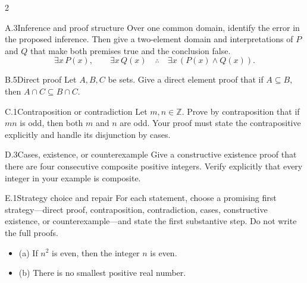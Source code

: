 \documentclass[9pt]{extarticle}
\begin{document}
\begin{multicols}{2}
\begin{CoreProblem}{A.3}{Inference and proof structure}
Over one common domain, identify the error in the proposed inference. Then give
a two-element domain and interpretations of $P$ and $Q$ that make both premises
true and the conclusion false.
\[
\exists x\,P(x),\qquad \exists x\,Q(x)
\quad\therefore\quad
\exists x\,(P(x)\land Q(x)).
\]
\end{CoreProblem}
\begin{CoreProblem}{B.5}{Direct proof}
Let $A,B,C$ be sets. Give a direct element proof that if $A\subseteq B$, then
$A\cap C\subseteq B\cap C$.
\end{CoreProblem}
\begin{CoreProblem}{C.1}{Contraposition or contradiction}
Let $m,n\in\mathbb Z$. Prove by contraposition that if $mn$ is odd, then both
$m$ and $n$ are odd. Your proof must state the contrapositive explicitly and
handle its disjunction by cases.
\end{CoreProblem}
\columnbreak
\begin{CoreProblem}{D.3}{Cases, existence, or counterexample}
Give a constructive existence proof that there are four consecutive composite
positive integers. Verify explicitly that every integer in your example is
composite.
\end{CoreProblem}
\begin{CoreProblem}{E.1}{Strategy choice and repair}
For each statement, choose a promising first strategy---direct proof,
contraposition, contradiction, cases, constructive existence, or
counterexample---and state the first substantive step. Do not write the full
proofs.
\begin{itemize}
  \item (a) If $n^2$ is even, then the integer $n$ is even.
  \item (b) There is no smallest positive real number.
\end{itemize}
\end{CoreProblem}
\end{multicols}
\CoreWorkArea
\FormBreak
{}
\end{document}
